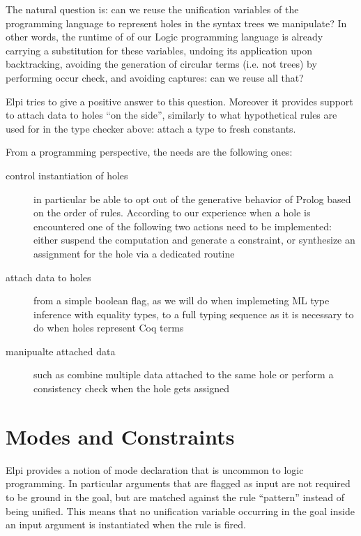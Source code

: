 \documentclass[a4paper, 11pt]{book}
\begin{document}
The natural question is: can we reuse the unification variables of
the programming language to represent holes in the syntax trees we manipulate?
In other words, the runtime of of our Logic programming language is already
carrying a substitution for these variables, undoing its application upon
backtracking, avoiding the generation of circular terms (i.e. not trees)
by performing occur check, and avoiding captures: can we reuse all that?

Elpi tries to give a positive answer to this question. Moreover it provides
support to attach data to holes ``on the side'', similarly to what
hypothetical rules are used for in the type checker above: attach a type
to fresh constants.

From a programming perspective, the needs are the following ones:

\begin{description}
  \item[control instantiation of holes] in particular be able to opt out of the
     generative behavior of Prolog based on the order of rules. According to
     our experience when a hole is encountered one of the following two
     actions need to be implemented: either suspend the computation and
     generate a constraint, or synthesize an assignment for the hole
     via a dedicated routine
  \item[attach data to holes] from a simple boolean flag, as we will do
    when implemeting ML type inference with equality types,
    to a full typing sequence as it is necessary to do when holes represent
    Coq terms

  \item[manipualte attached data] such as combine multiple data attached to the same
     hole or perform a consistency check when the hole gets assigned

\end{description}


\section{Modes and Constraints}\label{sec:modes}

Elpi provides a notion of mode declaration that is uncommon to logic programming.
In particular arguments that are flagged as input are not required to be
ground in the goal, but are matched against the rule ``pattern'' instead 
of being unified. This means that no unification variable occurring in
the goal inside an input argument is instantiated when the rule is
fired.
\end{document}
